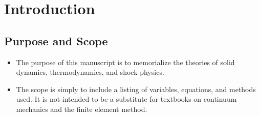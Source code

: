 \chapter{Introduction}
\section{Purpose and Scope}

\begin{itemize}

\item The purpose of this manuscript is to memorialize the
theories of solid dynamics, thermodynamics, and shock physics.

\item The scope is simply to include a listing of variables,
equations, and methods used.  It is not intended to
be a substitute for textbooks on continuum mechanics and
the finite element method.

\end{itemize}






